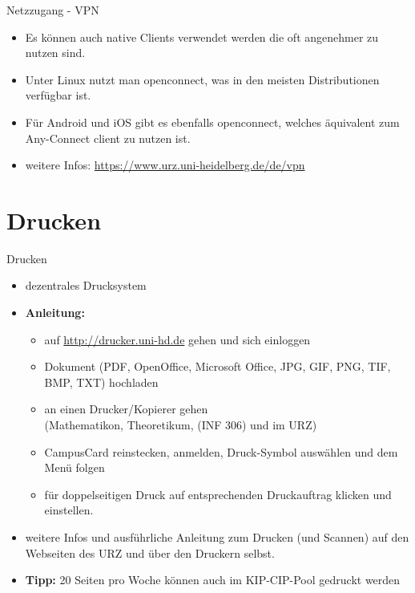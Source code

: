 \begin{frame}{Netzzugang - VPN}
    \begin{itemize}
        \item Es können auch native Clients verwendet werden die oft angenehmer zu nutzen sind.
        \item Unter Linux nutzt man openconnect, was in den meisten Distributionen verfügbar ist.
        \item Für Android und iOS gibt es ebenfalls openconnect, welches äquivalent zum Any-Connect client zu nutzen ist.\pause
        \item weitere Infos: \url{https://www.urz.uni-heidelberg.de/de/vpn}
    \end{itemize}
\end{frame}

\section{Drucken}
\begin{frame}{Drucken}
    \begin{itemize}
        \item dezentrales Drucksystem\pause
        \item \textbf{Anleitung:}
            \begin{itemize}
                \item auf \url{http://drucker.uni-hd.de} gehen und sich
                    einloggen
                \item Dokument (PDF, OpenOffice, Microsoft Office, JPG, GIF, PNG, TIF, BMP, TXT) hochladen
                \item an einen Drucker/Kopierer gehen \\
                    (Mathematikon, Theoretikum, (INF 306) und im URZ)
                \item CampusCard reinstecken, anmelden, Druck-Symbol auswählen
                    und dem Menü folgen
                \item für doppelseitigen Druck auf entsprechenden Druckauftrag klicken und einstellen.
            \end{itemize}\pause
        \item weitere Infos und ausführliche Anleitung zum Drucken (und
            Scannen) auf den Webseiten des URZ und über den Druckern selbst.
        \item \textbf{Tipp:} 20 Seiten pro Woche können auch im KIP-CIP-Pool gedruckt werden
    \end{itemize}
\end{frame}

